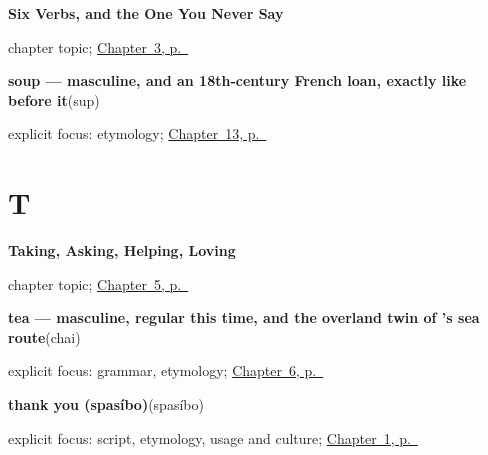 \noindent\begin{minipage}[t]{\linewidth}
\raggedright
\textbf{Six Verbs, and the One You Never Say}\par
\footnotesize chapter topic; \hyperref[ch:russian-first-verbs]{Chapter~3, p.~\pageref*{ch:russian-first-verbs}}
\end{minipage}\par\smallskip

\noindent\begin{minipage}[t]{\linewidth}
\raggedright
\textbf{soup — masculine, and an 18th-century French loan, exactly like  before it}\enspace\emph{}\enspace(sup)\par
\footnotesize explicit focus: etymology; \hyperref[ch:russian-milk-cheese-juice-soup]{Chapter~13, p.~\pageref*{ch:russian-milk-cheese-juice-soup}}
\end{minipage}\par\smallskip

\section*{T}

\noindent\begin{minipage}[t]{\linewidth}
\raggedright
\textbf{Taking, Asking, Helping, Loving}\par
\footnotesize chapter topic; \hyperref[ch:russian-verbs-of-the-hand]{Chapter~5, p.~\pageref*{ch:russian-verbs-of-the-hand}}
\end{minipage}\par\smallskip

\noindent\begin{minipage}[t]{\linewidth}
\raggedright
\textbf{tea — masculine, regular this time, and the overland twin of 's sea route}\enspace\emph{}\enspace(chai)\par
\footnotesize explicit focus: grammar, etymology; \hyperref[ch:russian-water-coffee-tea-bread]{Chapter~6, p.~\pageref*{ch:russian-water-coffee-tea-bread}}
\end{minipage}\par\smallskip

\noindent\begin{minipage}[t]{\linewidth}
\raggedright
\textbf{thank you (spasíbo)}\enspace\emph{}\enspace(spasíbo)\par
\footnotesize explicit focus: script, etymology, usage and culture; \hyperref[ch:russian-greetings]{Chapter~1, p.~\pageref*{ch:russian-greetings}}
\end{minipage}\par\smallskip

